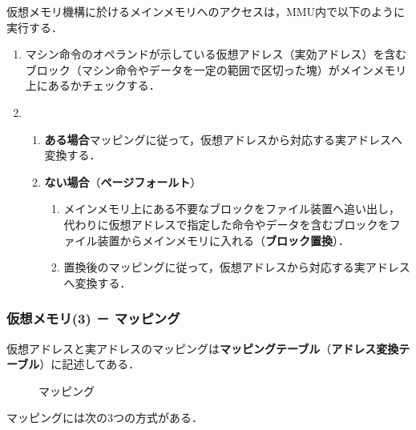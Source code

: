 仮想メモリ機構に於けるメインメモリへのアクセスは，MMU内で以下のように実行する．
\begin{enumerate}[label=\textbf{\arabic*.}, labelsep=10pt, leftmargin=23pt]
	\item マシン命令のオペランドが示している仮想アドレス（実効アドレス）を含むブロック（マシン命令やデータを一定の範囲で区切った塊）がメインメモリ上にあるかチェックする．
	\item 
		\begin{enumerate}[label=\textbf{(\alph*)}, labelsep=10pt, leftmargin=23pt]
			\item \textbf{ある場合}\qquad マッピングに従って，仮想アドレスから対応する実アドレスへ変換する．
			\item \textbf{ない場合}（\textbf{ページフォールト}）
				\begin{enumerate}[label=\textbf{(\arabic*)}, labelsep=10pt, leftmargin=23pt]
					\item メインメモリ上にある不要なブロックをファイル装置へ追い出し，代わりに仮想アドレスで指定した命令やデータを含むブロックをファイル装置からメインメモリに入れる（\textbf{ブロック置換}）．
					\item 置換後のマッピングに従って，仮想アドレスから対応する実アドレスへ変換する．
				\end{enumerate}
		\end{enumerate}
\end{enumerate}



\subsubsection{仮想メモリ(3) － マッピング}\label{sec:com_arch-2-D-7}

仮想アドレスと実アドレスのマッピングは\textbf{マッピングテーブル}（\textbf{アドレス変換テーブル}）に記述してある．

\begin{figure}[H]
	\begin{center}
		\caption{マッピング}
		\label{fig:com_arch-7}
	\end{center}
\end{figure}

マッピングには次の3つの方式がある．

